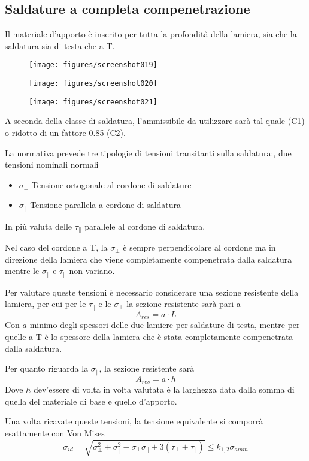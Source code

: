 \documentclass[a4paper, 15pt]{article}
\begin{document}
\subsection{Saldature a completa compenetrazione}
\begin{adjustwidth}{2in}{}
	Il materiale d'apporto  è inserito per tutta la profondità della lamiera, sia che la saldatura sia di testa che a T. 
	\begin{figure}[H]
		\parbox{0.45\textwidth}{\centering
		\texttt{[image: figures/screenshot019]}
		\label{fig:screenshot019}}
		\parbox{0.45\textwidth}{\centering
		\texttt{[image: figures/screenshot020]}
		\label{fig:screenshot020}}
	\end{figure}
\begin{figure}[H]
	\centering
	\label{fig:screenshot021}
	\texttt{[image: figures/screenshot021]}
\end{figure}
A seconda della classe di saldatura, l'ammissibile da utilizzare sarà tal quale (C1) o ridotto di un fattore 0.85 (C2). \newline 

La normativa prevede tre tipologie di tensioni transitanti sulla saldatura:, due tensioni nominali normali
\begin{itemize}
	\item $\sigma_{\perp}$ Tensione ortogonale al cordone di saldature
	\item $\sigma_{\parallel}$ Tensione parallela a cordone di saldatura
\end{itemize}
In più valuta delle $\tau_{\parallel}$ parallele al cordone di saldatura. 

Nel caso del cordone a T, la $\sigma_{\perp}$ è sempre perpendicolare al cordone ma in direzione della lamiera che viene completamente compenetrata dalla saldatura mentre le $\sigma_{\parallel}$ e $\tau_{\parallel}$ non variano. \newline 

Per valutare queste tensioni è necessario considerare una sezione resistente della lamiera, per cui per le $\tau_{\parallel}$ e le $\sigma_{\perp}$ la sezione resistente sarà pari a 
\[A_{res} = a\cdot L \]
Con $a$ minimo degli spessori delle due lamiere per saldature di testa, mentre per quelle a T è lo spessore della lamiera che è stata completamente compenetrata dalla saldatura.  \newline 

Per quanto riguarda la $\sigma_{\parallel}$, la sezione resistente sarà 
\[A_{res} = a\cdot h \]
Dove $h$ dev'essere di volta in volta valutata è la larghezza data dalla somma di quella del materiale di base e quello d'apporto. \newline 

Una volta ricavate queste tensioni, la tensione equivalente si comporrà esattamente con Von Mises
\[\sigma_{id} = \sqrt{\sigma_{\perp}^2 + \sigma_{\parallel}^2 - \sigma_{\perp}\sigma_{\parallel} + 3( \tau_{\perp} + \tau_{\parallel} )}\leq k_{1,2}\sigma_{amm}\]
\end{adjustwidth}
\newpage
\end{document}
